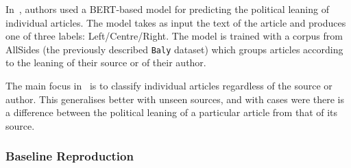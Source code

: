 

In~\citet{baly2020we}, authors used a BERT-based model for predicting the political leaning of individual articles. The model takes as input the text of the article and produces one of three labels: Left/Centre/Right. The model is trained with a corpus from AllSides  (the previously described \texttt{Baly} dataset) which groups articles %
according to the leaning of their source or of their author. %


The main focus in~\citet{baly2020we} is to classify individual articles regardless of the source or author. This generalises better with unseen sources, and with cases were there is a difference between the political leaning of a particular article from that of its source.



\subsubsection{\statusgreen Baseline Reproduction}
\label{ssec:ps_leaning_classifier}

